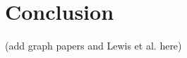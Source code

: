 \documentclass{scrartcl}
\begin{document}

\section{Conclusion}



(add graph papers and Lewis et al. here)
\end{document}
